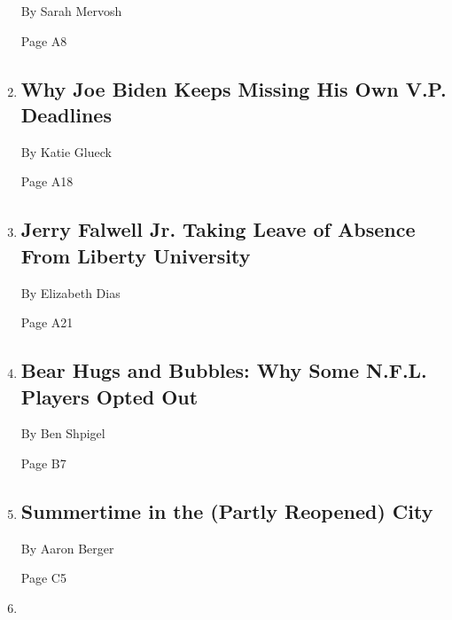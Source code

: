 \begin{enumerate}
  By Sarah Mervosh

  Page A8
\item
  \href{/2020/08/07/us/politics/joe-biden-vice-presidential-search.html}{}

  \hypertarget{why-joe-biden-keeps-missing-his-own-vp-deadlines}{%
  \subsection{Why Joe Biden Keeps Missing His Own V.P.
  Deadlines}\label{why-joe-biden-keeps-missing-his-own-vp-deadlines}}

  By Katie Glueck

  Page A18
\item
  \href{/2020/08/07/us/falwell-liberty.html}{}

  \hypertarget{jerry-falwell-jr-taking-leave-of-absence-from-liberty-university}{%
  \subsection{Jerry Falwell Jr. Taking Leave of Absence From Liberty
  University}\label{jerry-falwell-jr-taking-leave-of-absence-from-liberty-university}}

  By Elizabeth Dias

  Page A21
\item
  \href{/2020/08/08/sports/football/nfl-players-opt-out.html}{}

  \hypertarget{bear-hugs-and-bubbles-why-some-nfl-players-opted-out}{%
  \subsection{Bear Hugs and Bubbles: Why Some N.F.L. Players Opted
  Out}\label{bear-hugs-and-bubbles-why-some-nfl-players-opted-out}}

  By Ben Shpigel

  Page B7
\item
  \href{/2020/08/07/arts/design/high-line-governors-island-brooklyn-bridge-park.html}{}

  \hypertarget{summertime-in-the-partly-reopened-city}{%
  \subsection{Summertime in the (Partly Reopened)
  City}\label{summertime-in-the-partly-reopened-city}}

  By Aaron Berger

  Page C5
\item
  \href{/2020/08/06/movies/megan-fox-jennifers-body.html}{}


\end{enumerate}
